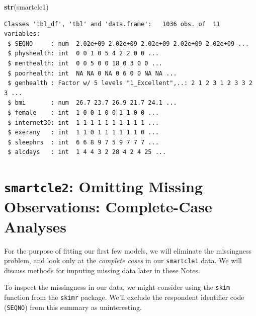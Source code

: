 \documentclass[]{book}
\newenvironment{Shaded}{\begin{snugshade}}{\end{snugshade}}
\newcommand{\KeywordTok}[1]{\textcolor[rgb]{0.13,0.29,0.53}{\textbf{#1}}}
\newcommand{\DataTypeTok}[1]{\textcolor[rgb]{0.13,0.29,0.53}{#1}}
\newcommand{\StringTok}[1]{\textcolor[rgb]{0.31,0.60,0.02}{#1}}
\newcommand{\OtherTok}[1]{\textcolor[rgb]{0.56,0.35,0.01}{#1}}
\newcommand{\OperatorTok}[1]{\textcolor[rgb]{0.81,0.36,0.00}{\textbf{#1}}}
\newcommand{\NormalTok}[1]{#1}
\theoremstyle{definition}
\theoremstyle{definition}
\theoremstyle{definition}
\theoremstyle{remark}
\begin{document}
\begin{Shaded}
\begin{Highlighting}[]
\KeywordTok{str}\NormalTok{(smartcle1)}
\end{Highlighting}
\end{Shaded}

\begin{verbatim}
Classes 'tbl_df', 'tbl' and 'data.frame':   1036 obs. of  11 variables:
 $ SEQNO     : num  2.02e+09 2.02e+09 2.02e+09 2.02e+09 2.02e+09 ...
 $ physhealth: int  0 0 1 0 5 4 2 2 0 0 ...
 $ menthealth: int  0 0 5 0 0 18 0 3 0 0 ...
 $ poorhealth: int  NA NA 0 NA 0 6 0 0 NA NA ...
 $ genhealth : Factor w/ 5 levels "1_Excellent",..: 2 1 2 3 1 2 3 3 2 3 ...
 $ bmi       : num  26.7 23.7 26.9 21.7 24.1 ...
 $ female    : int  1 0 0 1 0 0 1 1 0 0 ...
 $ internet30: int  1 1 1 1 1 1 1 1 1 1 ...
 $ exerany   : int  1 1 0 1 1 1 1 1 1 0 ...
 $ sleephrs  : int  6 6 8 9 7 5 9 7 7 7 ...
 $ alcdays   : int  1 4 4 3 2 28 4 2 4 25 ...
\end{verbatim}

\section{\texorpdfstring{\texttt{smartcle2}: Omitting Missing
Observations: Complete-Case
Analyses}{smartcle2: Omitting Missing Observations: Complete-Case Analyses}}\label{smartcle2-omitting-missing-observations-complete-case-analyses}

For the purpose of fitting our first few models, we will eliminate the
missingness problem, and look only at the \emph{complete cases} in our
\texttt{smartcle1} data. We will discuss methods for imputing missing
data later in these Notes.

To inspect the missingness in our data, we might consider using the
\texttt{skim} function from the \texttt{skimr} package. We'll exclude
the respondent identifier code (\texttt{SEQNO}) from this summary as
uninteresting.

\begin{Shaded}
\end{Shaded}
\end{document}
